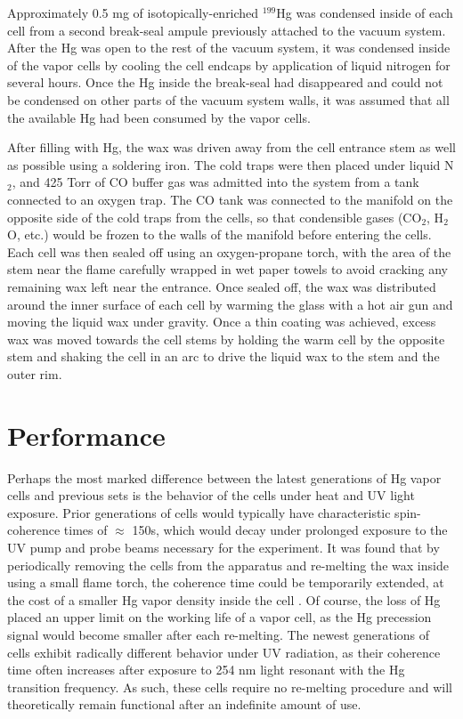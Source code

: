 \documentclass [10pt, twoside] {uwthesis}[2012/04/02]
\begin{document}
Approximately 0.5 mg of isotopically-enriched $^{199}$Hg was condensed inside of each cell from a second break-seal ampule previously attached to the vacuum system. After the Hg was open to the rest of the vacuum system, it was condensed inside of the vapor cells by cooling the cell endcaps by application of liquid nitrogen for several hours. Once the Hg inside the break-seal had disappeared and could not be condensed on other parts of the vacuum system walls, it was assumed that all the available Hg had been consumed by the vapor cells. 

After filling with Hg, the wax was driven away from the cell entrance stem as well as possible using a soldering iron. The cold traps were then placed under liquid N$_2$, and 425 Torr of CO buffer gas was admitted into the system from a tank connected to an oxygen trap. The CO tank was connected to the manifold on the opposite side of the cold traps from the cells, so that condensible gases (CO$_2$, H$_2$O, etc.) would be frozen to the walls of the manifold before entering the cells. Each cell was then sealed off using an oxygen-propane torch, with the area of the stem near the flame carefully wrapped in wet paper towels to avoid cracking any remaining wax left near the entrance. Once sealed off, the wax was distributed around the inner surface of each cell by warming the glass with a hot air gun and moving the liquid wax under gravity. Once a thin coating was achieved, excess wax was moved towards the cell stems by holding the warm cell by the opposite stem and shaking the cell in an arc to drive the liquid wax to the stem and the outer rim. 
 
\section{Performance}
Perhaps the most marked difference between the latest generations of Hg vapor cells and previous sets is the behavior of the cells under heat and UV light exposure. Prior generations of cells would typically have characteristic spin-coherence times of $\approx$ 150s, which would decay under prolonged exposure to the UV pump and probe beams necessary for the experiment. It was found that by periodically removing the cells from the apparatus and re-melting the wax inside using a small flame torch, the coherence time could be temporarily extended, at the cost of a smaller Hg vapor density inside the cell \cite{Swallows}\cite{Griffith}. Of course, the loss of Hg placed an upper limit on the working life of a vapor cell, as the Hg precession signal would become smaller after each re-melting. The newest generations of cells exhibit radically different behavior under UV radiation, as their coherence time often increases after exposure to 254 nm light resonant with the Hg transition frequency. As such, these cells require no re-melting procedure and will theoretically remain functional after an indefinite amount of use. 
\end{document}
